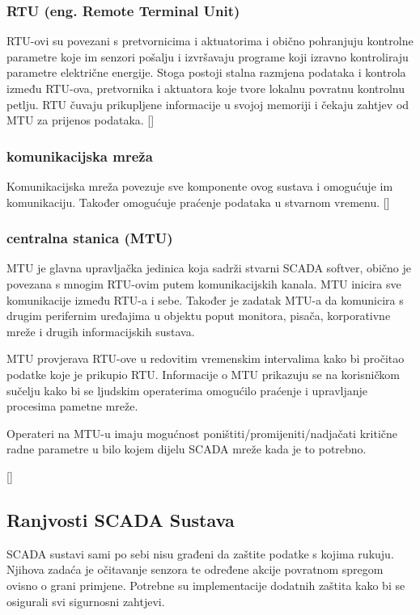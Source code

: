 \documentclass[times, utf8, zavrsni]{fer}
\begin{document}
\subsubsection{RTU (eng. Remote Terminal Unit)}
RTU-ovi su povezani s pretvornicima i aktuatorima i obično pohranjuju kontrolne parametre koje im senzori pošalju i izvršavaju programe koji izravno kontroliraju parametre električne energije. Stoga postoji stalna razmjena podataka i kontrola između RTU-ova, pretvornika i aktuatora koje tvore lokalnu povratnu kontrolnu petlju. RTU čuvaju prikupljene informacije u svojoj memoriji i čekaju zahtjev od MTU za prijenos podataka.
[\cite{scada-thesis}]

\subsubsection{komunikacijska mreža}
Komunikacijska mreža povezuje sve komponente ovog sustava i omogućuje im komunikaciju. Također omogućuje praćenje podataka u stvarnom vremenu.
[\cite{scada-thesis}]

\subsubsection{centralna stanica (MTU)}
MTU je glavna upravljačka jedinica koja sadrži stvarni SCADA softver, obično je povezana s mnogim RTU-ovim putem komunikacijskih kanala. MTU inicira sve komunikacije između RTU-a i sebe. Također je zadatak MTU-a da komunicira s drugim perifernim uređajima u objektu poput monitora, pisača, korporativne mreže i drugih informacijskih sustava. 

MTU provjerava RTU-ove u redovitim vremenskim intervalima kako bi pročitao podatke koje je prikupio RTU. Informacije o MTU prikazuju se na korisničkom sučelju kako bi se ljudskim operaterima omogućilo praćenje i upravljanje procesima pametne mreže. 

Operateri na MTU-u imaju mogućnost poništiti/promijeniti/nadjačati kritične radne parametre u bilo kojem dijelu SCADA mreže kada je to potrebno.

[\cite{scada-thesis}]

\subsection{Ranjvosti SCADA Sustava}
SCADA sustavi sami po sebi nisu građeni da zaštite podatke s kojima rukuju. Njihova zadaća je očitavanje senzora te određene akcije povratnom spregom ovisno o grani primjene. Potrebne su implementacije dodatnih zaštita kako bi se osigurali svi sigurnosni zahtjevi. 
\end{document}
